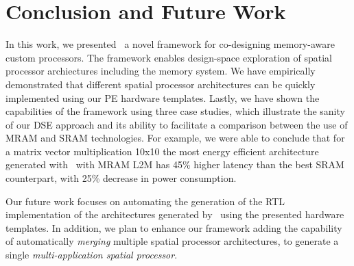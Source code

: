 \section{Conclusion and Future Work}
In this work, we presented \frameworkname~a novel framework for co-designing memory-aware custom processors.  
The framework enables design-space exploration of spatial processor archiectures including the memory system. We have empirically demonstrated that different spatial processor architectures can be quickly implemented using our PE hardware templates. Lastly, we have shown the capabilities of the framework using three case studies, which illustrate the sanity of our DSE approach and its ability to facilitate a comparison between the use of MRAM and SRAM technologies.  
For example, we were able to conclude that for a matrix vector multiplication 10x10 the most energy efficient architecture generated with \frameworkname~with MRAM L2M has 45\% higher latency than the best SRAM counterpart, with 25\% decrease in power consumption. 

Our future work focuses on automating the generation of the RTL implementation of the architectures generated by \frameworkname~using the presented hardware templates. In addition, we plan to enhance our framework adding the capability of automatically \textit{merging} multiple spatial processor architectures, to generate a single \textit{multi-application spatial processor}.

